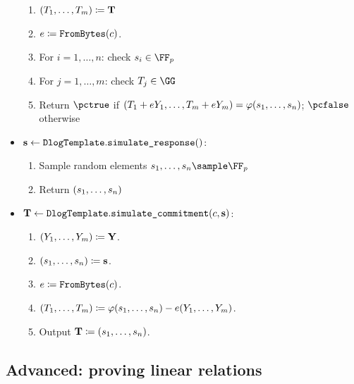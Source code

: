 \documentclass[11pt]{article}
\begin{document}
\begin{itemize}
\begin{enumerate}
      \item $(T_1, \dots, T_m) \coloneqq \mathbf {T}$
      \item  $e \coloneqq \texttt{FromBytes}(c)$.
      \item\label{item:basic:v:checks}
      For $i=1,\dots,n$: check $\response_i\in\FF_p$
      \item
      For $j=1,\dots,m$: check $\commitment_j\in\GG$
      \item Return $\accept$ if $(T_1 + eY_1,\dots,T_m + eY_m) = \varphi(s_1,\dots,s_n)$; $\reject$ otherwise
    \end{enumerate}
  \item $\mathbf {s} \gets \texttt{DlogTemplate}.\texttt{simulate\_response}()$:
  \begin{enumerate}
    \item Sample random elements $\response_1,\dots,\response_n\sample\FF_p$
    \item Return $(s_1, \dots, s_n)$
  \end{enumerate}
  \item\label{item:basic:sim}
     $\mathbf {T} \gets \texttt{DlogTemplate}.\texttt{simulate\_commitment}(c, \mathbf s)$:
    \begin{enumerate}
      \item
       $(Y_1,\dots,Y_m)\coloneqq \mathbf {Y}$.
      \item\label{item:basic:sim:s}
       $(s_1,\dots,s_n) \coloneqq \mathbf {s}$.
       \item  $e \coloneqq \texttt{FromBytes}(c)$.
      \item
         $(T_1,\dots,T_m) \coloneqq \varphi(s_1,\dots,s_n) - e(Y_1,\dots,Y_m)$.
      \item
        Output $\mathbf {T} \coloneqq(s_1,\dots,s_n)$.
    \end{enumerate}
\end{itemize}

\subsection{Advanced: proving linear relations}\label{sec:linear_relations}
\end{document}

